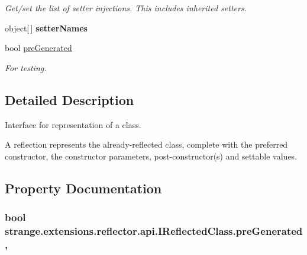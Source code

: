 \begin{DoxyCompactItemize}
\begin{DoxyCompactList}\small\item\em Get/set the list of setter injections. This includes inherited setters. \end{DoxyCompactList}\item 
\hypertarget{interfacestrange_1_1extensions_1_1reflector_1_1api_1_1_i_reflected_class_a7ff9cc32caeccf473c338a0e69378c94}{object\mbox{[}$\,$\mbox{]} {\bfseries setter\-Names}}\label{interfacestrange_1_1extensions_1_1reflector_1_1api_1_1_i_reflected_class_a7ff9cc32caeccf473c338a0e69378c94}

\item 
bool \hyperlink{interfacestrange_1_1extensions_1_1reflector_1_1api_1_1_i_reflected_class_a902b6a963d4f1c3ec30a91d726d79020}{pre\-Generated}
\begin{DoxyCompactList}\small\item\em For testing. \end{DoxyCompactList}\end{DoxyCompactItemize}


\subsection{Detailed Description}
Interface for representation of a class. 

A reflection represents the already-\/reflected class, complete with the preferred constructor, the constructor parameters, post-\/constructor(s) and settable values. 

\subsection{Property Documentation}
\hypertarget{interfacestrange_1_1extensions_1_1reflector_1_1api_1_1_i_reflected_class_a902b6a963d4f1c3ec30a91d726d79020}{
\subsubsection[{pre\-Generated}]{\setlength{\rightskip}{0pt plus 5cm}bool strange.\-extensions.\-reflector.\-api.\-I\-Reflected\-Class.\-pre\-Generated\hspace{0.3cm}{\ttfamily [get]}, {\ttfamily [set]}}}\label{interfacestrange_1_1extensions_1_1reflector_1_1api_1_1_i_reflected_class_a902b6a963d4f1c3ec30a91d726d79020}


